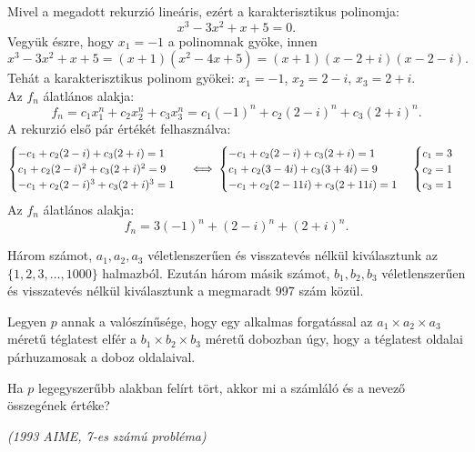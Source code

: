 \begin{solution}
Mivel a megadott rekurzió lineáris, ezért a karakterisztikus polinomja:
$$x^3-3x^2+x+5=0.$$
Vegyük észre, hogy $x_1=-1$ a polinomnak gyöke, innen
$$x^3-3x^2+x+5=(x+1)(x^2-4x+5)=(x+1)(x-2+i)(x-2-i).$$
Tehát a karakterisztikus polinom gyökei: $x_1=-1$, $x_2=2-i$, $x_3=2+i$.\\
Az $f_n$ álatlános alakja:
$$f_n=c_1x_1^n+c_2x_2^n+c_3x_3^n=c_1(-1)^n+c_2(2-i)^n+c_3(2+i)^n.$$
A rekurzió első pár értékét felhasználva:\\
\[
\begin{cases}
-c_1+c_2(2-i)+c_3(2+i)=1\\
c_1+c_2(2-i)^2+c_3(2+i)^2=9\\
-c_1+c_2(2-i)^3+c_3(2+i)^3=1\\
\end{cases}
\iff
\begin{cases}
-c_1+c_2(2-i)+c_3(2+i)=1\\
c_1+c_2(3-4i)+c_3(3+4i)=9\\
-c_1+c_2(2-11i)+c_3(2+11i)=1\\
\end{cases}\\
\begin{cases}
c_1=3\\
c_2=1\\
c_3=1\\
\end{cases}
\]
Az $f_n$ álatlános alakja:
$$f_n=3(-1)^n+(2-i)^n+(2+i)^n.$$
\end{solution}
\begin{extraproblem}
Három számot, $a_{1},a_{2},a_{3}$ véletlenszerűen és visszatevés
nélkül kiválasztunk az $\{1,2,3,\ldots,1000\}$ halmazból. Ezután
három másik számot, $b_{1},b_{2},b_{3}$ véletlenszerűen és visszatevés
nélkül kiválasztunk a megmaradt 997 szám közül.

Legyen $p$ annak a valószínűsége, hogy egy alkalmas forgatással az
$a_{1}\times a_{2}\times a_{3}$ méretű téglatest elfér a $b_{1}\times b_{2}\times b_{3}$
méretű dobozban úgy, hogy a téglatest oldalai párhuzamosak a doboz
oldalaival.

Ha $p$ legegyszerűbb alakban felírt tört, akkor mi a számláló és
a nevező összegének értéke?

\emph{(1993 AIME, 7-es számú probléma) }
\end{extraproblem}

